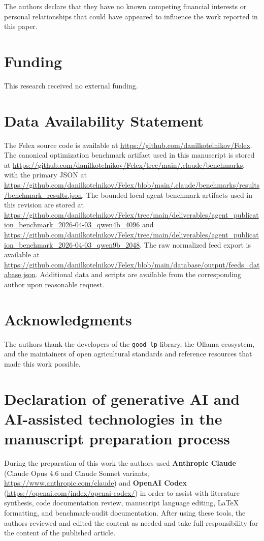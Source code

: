 \documentclass[a4paper,fleqn]{cas-sc}
\begin{document}
The authors declare that they have no known competing financial interests or personal relationships that could have appeared to influence the work reported in this paper.

\section*{Funding}

This research received no external funding.

\section*{Data Availability Statement}

The Felex source code is available at \url{https://github.com/danilkotelnikov/Felex}. The canonical optimization benchmark artifact used in this manuscript is stored at \url{https://github.com/danilkotelnikov/Felex/tree/main/.claude/benchmarks}, with the primary JSON at \url{https://github.com/danilkotelnikov/Felex/blob/main/.claude/benchmarks/results/benchmark_results.json}. The bounded local-agent benchmark artifacts used in this revision are stored at \url{https://github.com/danilkotelnikov/Felex/tree/main/deliverables/agent_publication_benchmark_2026-04-03_qwen4b_4096} and \url{https://github.com/danilkotelnikov/Felex/tree/main/deliverables/agent_publication_benchmark_2026-04-03_qwen9b_2048}. The raw normalized feed export is available at \url{https://github.com/danilkotelnikov/Felex/blob/main/database/output/feeds_database.json}. Additional data and scripts are available from the corresponding author upon reasonable request.

\section*{Acknowledgments}

The authors thank the developers of the \texttt{good\_lp} library, the Ollama ecosystem, and the maintainers of open agricultural standards and reference resources that made this work possible.

\section*{Declaration of generative AI and AI-assisted technologies in the manuscript preparation process}

During the preparation of this work the authors used \textbf{Anthropic Claude} (Claude Opus 4.6 and Claude Sonnet variants, \url{https://www.anthropic.com/claude}) and \textbf{OpenAI Codex} (\url{https://openai.com/index/openai-codex/}) in order to assist with literature synthesis, code documentation review, manuscript language editing, LaTeX formatting, and benchmark-audit documentation. After using these tools, the authors reviewed and edited the content as needed and take full responsibility for the content of the published article.

\printcredits



\end{document}
